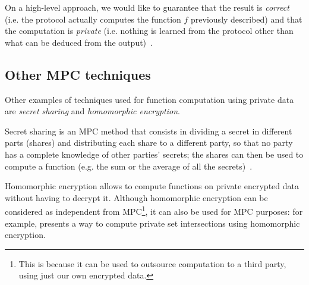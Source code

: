 On a high-level approach, we would like to guarantee that the result is \textit{correct} (i.e. the protocol actually computes the function $f$ previously described) and that the computation is \textit{private} (i.e. nothing is learned from the protocol other than what can be deduced from the output)~\cite{yao-proof}.

\subsection{Other MPC techniques}

Other examples of techniques used for function computation using private data are \textit{secret sharing} and \textit{homomorphic encryption}. 

Secret sharing is an MPC method that consists in dividing a secret in different parts (shares) and distributing each share to a different party, so that no party has a complete knowledge of other parties' secrets; the shares can then be used to compute a function (e.g. the sum or the average of all the secrets)~\cite{shamir79}.

Homomorphic encryption allows to compute functions on private encrypted data without having to decrypt it. Although homomorphic encryption can be considered as independent from MPC\footnote{This is because it can be used to outsource computation to a third party, using just our own encrypted data.}, it can also be used for MPC purposes: for example, \cite{private-set-intersection} presents a way to compute private set intersections using homomorphic encryption.
